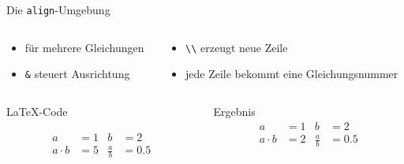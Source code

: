 \begin{frame}[fragile]{
  Die \texttt{align}-Umgebung
  \hfill{}
}
  \begin{columns}[t]
    \begin{column}{0.35\textwidth}
      \begin{itemize}
        \item für mehrere Gleichungen
        \item \texttt{\&} steuert Ausrichtung
      \end{itemize}
    \end{column}
    \begin{column}{0.6\textwidth}
      \begin{itemize}
        \item \texttt{\textbackslash\textbackslash} erzeugt neue Zeile
        \item jede Zeile bekommt eine Gleichungsnummer
      \end{itemize}
    \end{column}
  \end{columns}
  \vfill
  \begin{columns}[T]
    \begin{column}{0.65\textwidth}
      \begin{block}{\LaTeX-Code}
        \begin{lstverbatim}
        \begin{align}
          a         &= 1 & b           &= 2 \\
          a \cdot b &= 5 & \frac{a}{b} &= \num{0,5}
        \end{align}
        \end{lstverbatim}
      \end{block}
    \end{column}
    \begin{column}{0.3\textwidth}
      \begin{block}{Ergebnis}
        \begin{align}
          a         &= 1 & b           &= 2 \\
          a \cdot b &= 2 & \frac{a}{b} &= \num{0,5}
        \end{align}
      \end{block}
    \end{column}
  \end{columns}
\end{frame}

